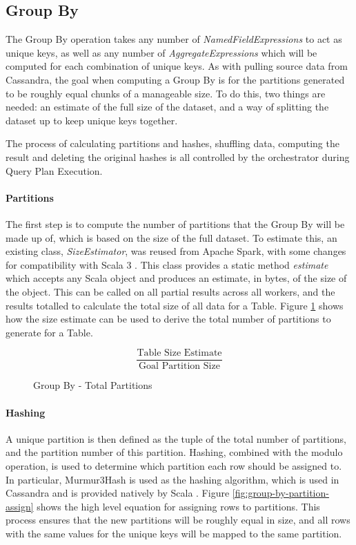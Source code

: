 \subsection{Group By}\label{subsec:group-by}
The Group By operation takes any number of \textit{NamedFieldExpressions} to act as unique keys, as well as any number of \textit{AggregateExpressions} which will be computed for each combination of unique keys. As with pulling source data from Cassandra, the goal when computing a Group By is for the partitions generated to be roughly equal chunks of a manageable size. To do this, two things are needed: an estimate of the full size of the dataset, and a way of splitting the dataset up to keep unique keys together. 

The process of calculating partitions and hashes, shuffling data, computing the result and deleting the original hashes is all controlled by the orchestrator during Query Plan Execution.

\paragraph{Partitions}
The first step is to compute the number of partitions that the Group By will be made up of, which is based on the size of the full dataset. To estimate this, an existing class, \textit{SizeEstimator}, was reused from Apache Spark, with some changes for compatibility with Scala 3 \cite{zaharia2016spark}. This class provides a static method \textit{estimate} which accepts any Scala object and produces an estimate, in bytes, of the size of the object. This can be called on all partial results across all workers, and the results totalled to calculate the total size of all data for a Table. Figure \ref{fig:group-by-num-partitions} shows how the size estimate can be used to derive the total number of partitions to generate for a Table.

\begin{figure}[h]
	\centering
	\[ \frac{\text{Table Size Estimate}}{\text{Goal Partition Size}} \]
	\caption{Group By - Total Partitions}
	\label{fig:group-by-num-partitions}
\end{figure}



\paragraph{Hashing} 
A unique partition is then defined as the tuple of the total number of partitions, and the partition number of this partition. Hashing, combined with the modulo operation, is used to determine which partition each row should be assigned to. In particular, Murmur3Hash is used as the hashing algorithm, which is used in Cassandra and is provided natively by Scala \cite{murmur3hash}. Figure \ref{fig:group-by-partition-assign} shows the high level equation for assigning rows to partitions. This process ensures that the new partitions will be roughly equal in size, and all rows with the same values for the unique keys will be mapped to the same partition.

